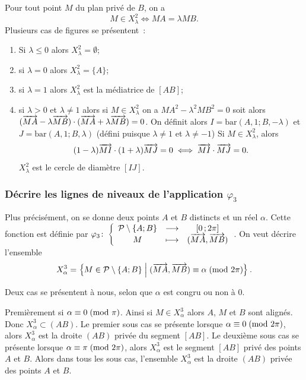 Pour tout point \(M\) du plan privé de \(B\), on a
\begin{equation}
  M \in X_{\lambda}^2 \iff MA = \lambda MB.
\end{equation}
Plusieurs cas de figures se présentent~:
\begin{enumerate}
  \item Si \(\lambda \leqslant 0\) alors \(X_{\lambda}^2 = \emptyset\);
  \item si \(\lambda = 0\) alors \(X_{\lambda}^2 = \{A\}\);
  \item si \(\lambda = 1\) alors \(X_{\lambda}^2\) est la médiatrice de 
    \([AB]\);
  \item si \(\lambda > 0\) et \(\lambda \neq 1\) alors si \(M \in 
    X_{\lambda}^2\) on a \(MA^2 - \lambda^2 MB^2 = 0\) soit alors 
    \((\overrightarrow{MA}-\lambda \overrightarrow{MB}) \cdot (\overrightarrow{MA} + \lambda 
    \overrightarrow{MB}) = 0\). On définit alors \(I = \text{bar}(A , 1;B , 
    -\lambda)\) et \(J = \text{bar}(A , 1;B , \lambda)\) (défini puisque 
    \(\lambda \neq 1\) et \(\lambda \neq -1\))
    Si \(M \in X_{\lambda}^2\), alors
    \begin{equation}
      (1 - \lambda) \overrightarrow{MI} \cdot (1 + \lambda) \overrightarrow{MJ} = 0 \iff 
    \overrightarrow{MI} \cdot \overrightarrow{MJ} = 0.  \end{equation}
    \(X_{\lambda}^2\) est le cercle de diamètre \([IJ]\).
\end{enumerate}

\subsubsection{Décrire les lignes de niveaux de l'application 
\(\varphi_3\)}

Plus précisément, on se donne deux points \(A\) et \(B\) distincts et un 
réel \(\alpha\). Cette fonction est définie par 
\(\varphi_3\colon \left\{\begin{array}{ccc} \mathcal{P}\setminus\{A;B\} & \longrightarrow &\left[ 0 \, ;  2\pi \right]\\ M & \longmapsto & (\overrightarrow{MA}, 
\overrightarrow{MB}) \end{array} \right.\). On veut décrire l'ensemble
\begin{equation}
  X_{\alpha}^3 = \left\{M \in 
  \mathcal{P}\setminus\{A;B\}\mathrel{}\middle|\mathrel{}(\overrightarrow{MA},\overrightarrow{MB}) \equiv \alpha\!\pmod {2\pi}\right\}.  
\end{equation}

Deux cas se présentent à nous, selon que \(\alpha\) est congru ou non à 0.

Premièrement si \(\alpha \equiv 0\!\pmod {\pi}\). Ainsi si \(M \in X_\alpha^3\) 
alors \(A\), \(M\) et \(B\) sont alignés. Donc \(X_\alpha^3 \subset (AB)\). Le 
premier sous cas se présente lorsque \(\alpha \equiv 0\!\pmod {2\pi}\), alors 
\(X_\alpha^3\) est la droite \((AB)\) privée du segment \([AB]\). Le deuxième 
sous cas se présente lorsque \(\alpha \equiv \pi\!\pmod {2\pi}\), alors  
\(X_\alpha^3\) est le segment \([AB]\) privé des points \(A\) et \(B\).  Alors 
dans tous les sous cas, l'ensemble \(X_\alpha^3\) est la droite \((AB)\) 
privée des points \(A\) et \(B\).

